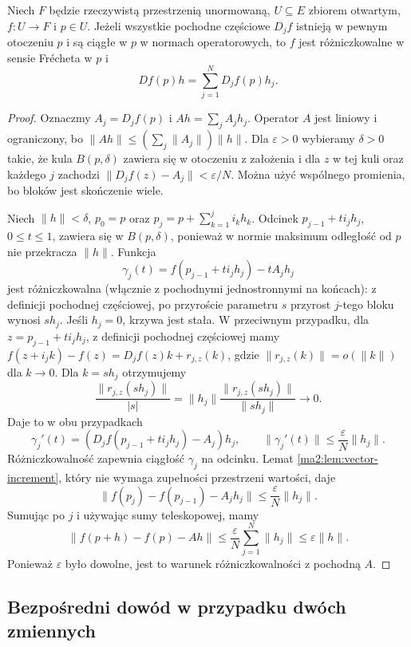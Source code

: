 \begin{twierdzenie}
\label{ma2:thm:continuous-block-partials}
Niech $F$ będzie rzeczywistą przestrzenią unormowaną,
$U\subseteq E$ zbiorem otwartym, $f:U\to F$ i $p\in U$.
Jeżeli wszystkie pochodne częściowe $D_jf$ istnieją
w pewnym otoczeniu $p$ i są ciągłe w $p$ w normach
operatorowych, to $f$ jest różniczkowalne w sensie
Frécheta w $p$ i
\[
 Df(p)h=\sum_{j=1}^N D_jf(p)h_j.
\]
\end{twierdzenie}
\begin{proof}
Oznaczmy $A_j=D_jf(p)$ i
$Ah=\sum_j A_jh_j$. Operator $A$ jest liniowy
i ograniczony, bo $\|Ah\|\le(\sum_j\|A_j\|)\|h\|$.
Dla $\varepsilon>0$ wybieramy $\delta>0$ takie,
że kula $B(p,\delta)$ zawiera się w otoczeniu
z założenia i dla $z$ w tej kuli oraz każdego $j$
zachodzi $\|D_jf(z)-A_j\|<\varepsilon/N$.
Można użyć wspólnego promienia, bo bloków jest skończenie wiele.

Niech $\|h\|<\delta$, $p_0=p$ oraz
$p_j=p+\sum_{k=1}^j i_k h_k$.
Odcinek $p_{j-1}+t i_jh_j$, $0\le t\le1$,
zawiera się w $B(p,\delta)$, ponieważ w normie
maksimum odległość od $p$ nie przekracza $\|h\|$.
Funkcja
\[
 \gamma_j(t)=f(p_{j-1}+t i_jh_j)-t A_jh_j
\]
jest różniczkowalna (włącznie z pochodnymi jednostronnymi
na końcach): z definicji pochodnej częściowej,
po przyroście parametru $s$ przyrost $j$-tego bloku
wynosi $s h_j$. Jeśli $h_j=0$, krzywa jest stała.
W przeciwnym przypadku, dla $z=p_{j-1}+t i_jh_j$,
z definicji pochodnej częściowej mamy
$f(z+i_jk)-f(z)=D_jf(z)k+r_{j,z}(k)$,
gdzie $\|r_{j,z}(k)\|=o(\|k\|)$ dla $k\to0$.
Dla $k=sh_j$ otrzymujemy
\[
 \frac{\|r_{j,z}(sh_j)\|}{|s|}
 =\|h_j\|\frac{\|r_{j,z}(sh_j)\|}{\|sh_j\|}
 \longrightarrow0.
\]
Daje to w obu przypadkach
\[
 \gamma_j'(t)=
 (D_jf(p_{j-1}+t i_jh_j)-A_j)h_j,
 \qquad
 \|\gamma_j'(t)\|\le\frac{\varepsilon}{N}\|h_j\|.
\]
Różniczkowalność zapewnia ciągłość $\gamma_j$ na odcinku.
Lemat \ref{ma2:lem:vector-increment}, który nie wymaga
zupełności przestrzeni wartości, daje
\[
 \|f(p_j)-f(p_{j-1})-A_jh_j\|
 \le\frac{\varepsilon}{N}\|h_j\|.
\]
Sumując po $j$ i używając sumy teleskopowej, mamy
\[
 \|f(p+h)-f(p)-Ah\|
 \le\frac{\varepsilon}{N}\sum_{j=1}^N\|h_j\|
 \le\varepsilon\|h\|.
\]
Ponieważ $\varepsilon$ było dowolne, jest to
warunek różniczkowalności z pochodną $A$.
\end{proof}

\subsection{Bezpośredni dowód w przypadku dwóch zmiennych}

